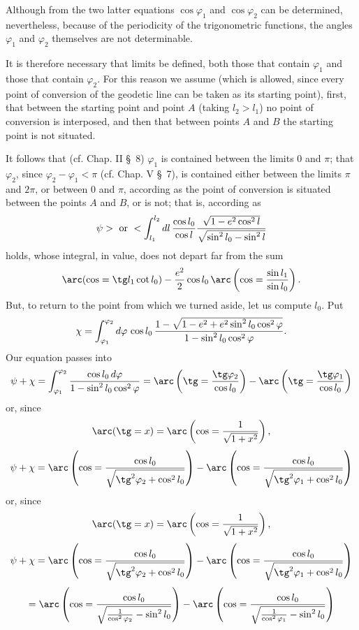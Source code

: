 \begingroup\small
Although from the two latter equations $\cos\varphi_1$ and $\cos\varphi_2$ can be determined, nevertheless, because of the periodicity of the trigonometric functions, the angles $\varphi_1$ and $\varphi_2$ themselves are not determinable.

It is therefore necessary that limits be defined, both those that contain $\varphi_1$ and those that contain $\varphi_2$. For this reason we assume (which is allowed, since every point of conversion of the geodetic line can be taken as its starting point), first, that between the starting point and point $A$ (taking $l_2>l_1$) no point of conversion is interposed, and then that between points $A$ and $B$ the starting point is not situated.

It follows that (cf. Chap. II \S\ 8) $\varphi_1$ is contained between the limits $0$ and $\pi$; that $\varphi_2$, since $\varphi_2-\varphi_1<\pi$ (cf. Chap. V \S\ 7), is contained either between the limits $\pi$ and $2\pi$, or between $0$ and $\pi$, according as the point of conversion is situated between the points $A$ and $B$, or is not; that is, according as
\[
 \psi >\text{ or }<\int_{l_1}^{l_2} dl\,{\cos l_0\over\cos l}{\sqrt{1-e^2\cos^2l}\over \sqrt{\sin^2l_0-\sin^2l}}
\]
holds, whose integral, in value, does not depart far from the sum
\[
 \arc(\cos=\tg l_1\cot l_0)-{e^2\over2}\cos l_0\,\arc\left(\cos={\sin l_1\over\sin l_0}\right).
\]
But, to return to the point from which we turned aside, let us compute $l_0$. Put
\[
 \chi=\int_{\varphi_1}^{\varphi_2} d\varphi\,\cos l_0\,{1-\sqrt{1-e^2+e^2\sin^2l_0\cos^2\varphi}\over 1-\sin^2l_0\cos^2\varphi}.
\]
Our equation passes into
\[
 \psi+\chi=\int_{\varphi_1}^{\varphi_2}{\cos l_0\,d\varphi\over1-\sin^2l_0\cos^2\varphi}
 =\arc\left(\tg={\tg\varphi_2\over\cos l_0}\right)-\arc\left(\tg={\tg\varphi_1\over\cos l_0}\right)
\]
or, since
\[
 \arc(\tg=x)=\arc\left(\cos={1\over\sqrt{1+x^2}}\right),
\]
\[
 \psi+\chi=\arc\left(\cos={\cos l_0\over\sqrt{\tg^2\varphi_2+\cos^2l_0}}\right)-\arc\left(\cos={\cos l_0\over\sqrt{\tg^2\varphi_1+\cos^2l_0}}\right)
\]
or, since
\[
 \arc(\tg=x)=\arc\left(\cos={1\over\sqrt{1+x^2}}\right),
\]
\[
 \psi+\chi=\arc\left(\cos={\cos l_0\over\sqrt{\tg^2\varphi_2+\cos^2l_0}}\right)-\arc\left(\cos={\cos l_0\over\sqrt{\tg^2\varphi_1+\cos^2l_0}}\right)
\]
\[
=\arc\left(\cos={\cos l_0\over\sqrt{{1\over\cos^2\varphi_2}-\sin^2l_0}}\right)-\arc\left(\cos={\cos l_0\over\sqrt{{1\over\cos^2\varphi_1}-\sin^2l_0}}\right)
\]
\endgroup
